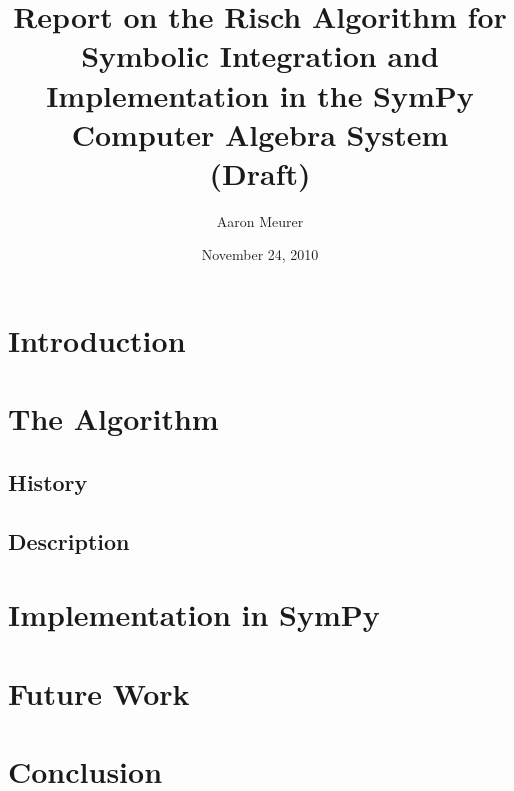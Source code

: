 \documentclass[12pt,titlepage]{article}
\newcommand{\SymPy}{Sym\-Py}
\begin{document}
\title{Report on the Risch Algorithm for Symbolic
Integration and Implementation in the Sym\-Py Computer Algebra System \\(Draft)}
\author{Aaron Meurer}
\date{November 24, 2010}
\maketitle
%
\begin{abstract}

\end{abstract}

\tableofcontents
\listoffigures
\listoftables

\section{Introduction}


\section{The Algorithm}
\subsection{History}


\subsection{Description}


\section{Implementation in \SymPy}


\section{Future Work}


\section{Conclusion}


\appendix

\glsaddall
\printglossary

\nocite{*}


\end{document}
